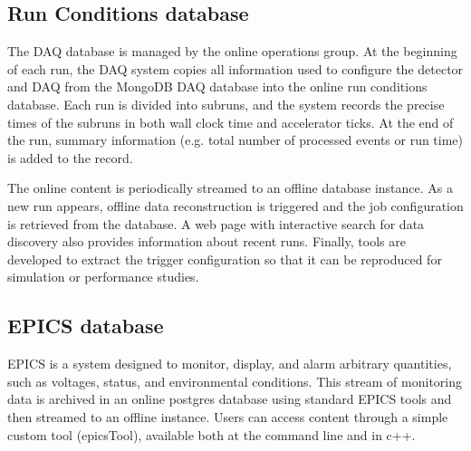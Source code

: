 


\subsection{Run Conditions database} 
The DAQ database is managed by the online operations group. At the beginning of each run, the DAQ system copies all information used to configure the detector and DAQ from the MongoDB DAQ database into the online run conditions database. Each run is divided into subruns, and the system records the precise times of the subruns in both wall clock time and accelerator ticks. At the end of the run, summary information (e.g. total number of processed events or run time) is added to the record. 

The online content is periodically streamed to an offline database instance. As a new run appears, offline data reconstruction is triggered and the job configuration is retrieved from the database. A web page with interactive search for data discovery also provides information about recent runs. Finally, tools are developed to extract the trigger configuration so that it can be reproduced for simulation or performance studies. 

\subsection{EPICS database}
EPICS is a system designed to monitor, display, and alarm arbitrary quantities, such as voltages, status, and environmental conditions. This stream of monitoring data is archived in an online postgres database using standard EPICS tools and then streamed to an offline instance. Users can access content through a simple custom tool (epicsTool), available both at the command line and in c++.


